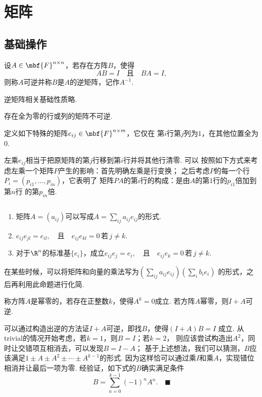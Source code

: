 \section{矩阵}
\subsection{基础操作}

  \begin{defi}[逆]
    设$A\in\mbf{F}^{n\times n}$，若存在方阵$B$，使得
    \begin{equation*}
      AB=I \quad \text{且} \quad BA=I,
    \end{equation*}
    则称$A$可逆并称$B$是$A$的逆矩阵，记作$A^{-1}$.
  \end{defi}
  \remark
    逆矩阵相关基础性质略.

  \begin{lemma}[不可逆]
    存在全为零的行或列的矩阵不可逆.
  \end{lemma}

  \begin{defi}
    \label{defi: 矩阵元}
    定义如下特殊的矩阵$e_{ij}\in\mbf{F}^{n\times m}$，它仅在
    第$i$行第$j$列为$1$，在其他位置全为$0$.
  \end{defi}
  \remark
    左乘$e_{ij}$相当于把原矩阵的第$j$行移到第$i$行并将其他行清零. 可以
    按照如下方式来考虑左乘一个矩阵$P$产生的影响：首先明确左乘是行变换；
    之后考虑$P$的每一个行$P_i = (p_{i1},\dots,p_{in})$，它表明了
    矩阵$PA$的第$i$行的构成：是由$A$的第$1$行的$p_{i1}$倍加到第$n$行
    的第$p_{in}$倍.

  \begin{pos}[矩阵元的性质]
    \label{pos: 矩阵元的性质}
    $\,$
    \begin{enumerate}
      \item 矩阵$A=(a_{ij})$可以写成$A=\sum_{ij}a_{ij}e_{ij}$的形式.
      \item $e_{ij}e_{jl} = e_{il},\quad\text{且}\quad e_{ij}e_{kl}=0
            \,\text{若}\,j\ne k$.
      \item 对于$\R^n$的标准基$\{e_i\}$，成立$e_{ij}e_j=e_i,\quad\text{且}
            \quad e_{ij}e_k=0\,\text{若}\, j\ne k$.
    \end{enumerate}
  \end{pos}
  \remark
    在某些时候，可以将矩阵和向量的乘法写为$(\sum_{ij}a_{ij}e_{ij})(\sum_ib_ie_i)$
    的形式，之后再利用此命题进行化简.

  \begin{thm}
    称方阵$A$是幂零的，若存在正整数$k$，使得$A^k=0$成立.
    若方阵$A$幂零，则$I+A$可逆.
  \end{thm}
  \proof
    可以通过构造出逆的方法证$I+A$可逆，即找$B$，使得$(I+A)B=I$
    成立. 从trivial的情况开始考虑，若$k=1$，则$B=I$；若$k=2$，
    则应该尝试构造出$A^2$，同时让交错项互相消去，可以发现$B=I-A$；
    基于上述想法，我们可以猜测，$B$应该满足$1\pm A\pm A^2\pm\cdots
    \pm A^{k-1}$的形式. 因为这样恰可以通过乘$I$和乘$A$，实现错位
    相消并让最后一项为零. 经验证，如下式的$B$确实满足条件
    \[
      B=\sum_{n=0}^{k-1}(-1)^nA^n.\quad\blacksquare
    \]

